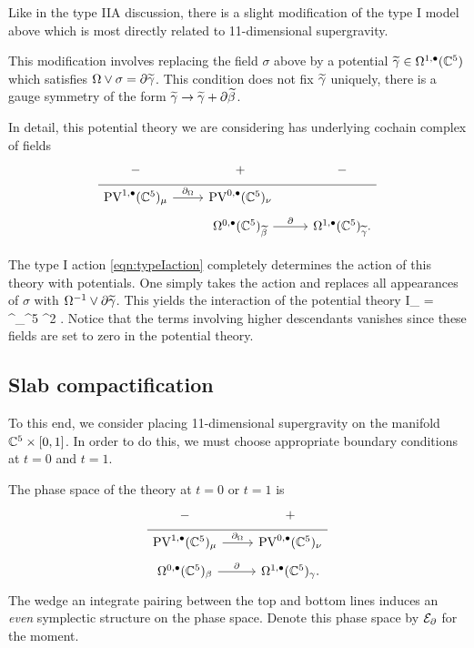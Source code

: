 Like in the type IIA discussion, there is a slight modification of the type I model above which is most directly related to 11-dimensional supergravity. 

This modification involves replacing the field $\sigma$ above by a potential $\widetilde \gamma \in \Omega^{1,\bullet}(\mathbb C^5)$ which satisfies $\Omega \vee \sigma = \partial \widetilde \gamma$. 
This condition does not fix $\widetilde \gamma$ uniquely, there is a gauge symmetry of the form $\widetilde \gamma \to \widetilde \gamma + \partial \widetilde \beta$. 

In detail, this potential theory we are considering has underlying cochain complex of fields
\begin{equation}
  \label{eq:Ipot} 
  \begin{tikzcd}[row sep = 1 ex]
    - & + & -\\ \hline
    \PV^{1,\bu}(\CC^5)_\mu \ar[r, "\div"] & \PV^{0,\bu}(\CC^5)_\nu  \\
         & \Omega^{0,\bu}(\CC^5)_{\til\beta} \ar[r, "\del"] & \Omega^{1,\bu}(\CC^5)_{\til\gamma} .
\end{tikzcd}
\end{equation} 

The type I action \eqref{eqn:typeIaction} completely determines the action of this theory with potentials. 
One simply takes the action and replaces all appearances of $\sigma$ with $\Omega^{-1} \vee \partial \widetilde\gamma$. 
This yields the interaction of the potential theory
\beqn\label{eqn:Iactionpot}
\til I_{} =  \int^\Omega_{\CC^5}  \mu^2 \vee \del \til\gamma .
\eeqn
Notice that the terms involving higher descendants vanishes since these fields are set to zero in the potential theory.

\subsection{Slab compactification} 

To this end, we consider placing 11-dimensional supergravity on the manifold $\mathbb C^5 \times [0,1]$. 
In order to do this, we must choose appropriate boundary conditions at $t=0$ and $t=1$.

The phase space of the theory at $t=0$ or $t=1$ is 
\begin{equation}
  \label{eq:lin1} 
  \begin{tikzcd}[row sep = 1 ex]
    - & + \\ \hline
    \PV^{1,\bu}(\CC^5)_\mu \ar[r, "\div"] & \PV^{0,\bu}(\CC^5)_\nu \\ 
     \Omega^{0,\bu}(\CC^5)_\beta \ar[r, "\del"] & \Omega^{1,\bu}(\CC^5)_\gamma.
\end{tikzcd}
\end{equation}
The wedge an integrate pairing between the top and bottom lines induces an {\em even} symplectic structure on the phase space. 
Denote this phase space by $\mathcal E_{\partial}$ for the moment.

